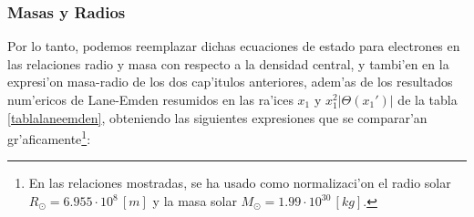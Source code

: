 \subsubsection{Masas y Radios}
Por lo tanto, podemos reemplazar dichas ecuaciones de estado para electrones en las relaciones radio y masa con respecto a la densidad central, y tambi'en en la expresi'on masa-radio de los dos cap'itulos anteriores, adem'as de los resultados num'ericos  de Lane-Emden resumidos en las ra'ices $x_1$ y $x_1^2\left|\Theta(x_1')\right|$ de la tabla \ref{tablalaneemden}, obteniendo las siguientes expresiones que se comparar'an gr'aficamente\footnote{En las relaciones mostradas, se ha usado como normalizaci'on el radio solar $R_{\odot}=6.955\cdot 10^{8}\,[m]$ y la masa solar $M_{\odot}=1.99\cdot10^{30}\,[kg]$.}:

\begin{enumerate}


\end{enumerate}
